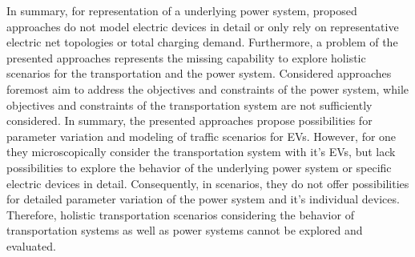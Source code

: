 In summary, for representation of a underlying power system, proposed approaches do not model electric devices in detail or only rely on representative electric net topologies or total charging demand. Furthermore, a problem of the presented approaches represents the missing capability to explore holistic scenarios for the transportation and the power system. Considered approaches foremost aim to address the objectives and constraints of the power system, while objectives and constraints of the transportation system are not sufficiently considered. In summary, the presented approaches propose possibilities for parameter variation and modeling of traffic scenarios for EVs. However, for one they microscopically consider the transportation system with it's EVs, but lack possibilities to explore the behavior of the underlying power system or specific electric devices in detail. Consequently, in scenarios, they do not offer possibilities for detailed parameter variation of the power system and it's individual devices. Therefore, holistic transportation scenarios considering the behavior of transportation systems as well as power systems cannot be explored and evaluated.